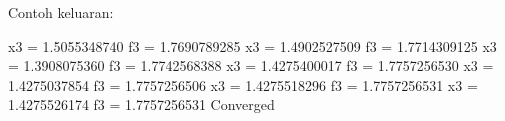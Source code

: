 Contoh keluaran:
\begin{textcode}
x3 =       1.5055348740 f3 =       1.7690789285
x3 =       1.4902527509 f3 =       1.7714309125
x3 =       1.3908075360 f3 =       1.7742568388
x3 =       1.4275400017 f3 =       1.7757256530
x3 =       1.4275037854 f3 =       1.7757256506
x3 =       1.4275518296 f3 =       1.7757256531
x3 =       1.4275526174 f3 =       1.7757256531
Converged
\end{textcode}